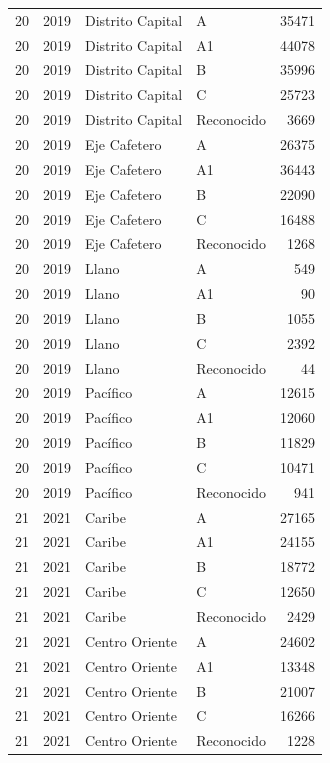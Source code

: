 \documentclass[12pt,letterpaper]{article}
\begin{document}
\begin{center}
\begin{longtable}{ccllr}
20 & 2019 & Distrito Capital & A & 35471 \\
20 & 2019 & Distrito Capital & A1 & 44078 \\
20 & 2019 & Distrito Capital & B & 35996 \\
20 & 2019 & Distrito Capital & C & 25723 \\
20 & 2019 & Distrito Capital & Reconocido & 3669 \\

20 & 2019 & Eje Cafetero & A & 26375 \\
20 & 2019 & Eje Cafetero & A1 & 36443 \\
20 & 2019 & Eje Cafetero & B & 22090 \\
20 & 2019 & Eje Cafetero & C & 16488 \\
20 & 2019 & Eje Cafetero & Reconocido & 1268 \\

20 & 2019 & Llano & A & 549 \\
20 & 2019 & Llano & A1 & 90 \\
20 & 2019 & Llano & B & 1055 \\
20 & 2019 & Llano & C & 2392 \\
20 & 2019 & Llano & Reconocido & 44 \\

20 & 2019 & Pacífico & A & 12615 \\
20 & 2019 & Pacífico & A1 & 12060 \\
20 & 2019 & Pacífico & B & 11829 \\
20 & 2019 & Pacífico & C & 10471 \\
20 & 2019 & Pacífico & Reconocido & 941 \\

21 & 2021 & Caribe & A & 27165 \\
21 & 2021 & Caribe & A1 & 24155 \\
21 & 2021 & Caribe & B & 18772 \\
21 & 2021 & Caribe & C & 12650 \\
21 & 2021 & Caribe & Reconocido & 2429 \\

21 & 2021 & Centro Oriente & A & 24602 \\
21 & 2021 & Centro Oriente & A1 & 13348 \\
21 & 2021 & Centro Oriente & B & 21007 \\
21 & 2021 & Centro Oriente & C & 16266 \\
21 & 2021 & Centro Oriente & Reconocido & 1228 \\


\end{longtable}
\end{center}
\end{document}
